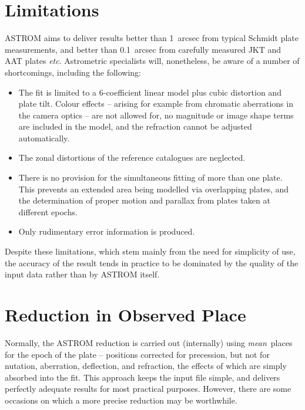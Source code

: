 \section{Limitations}
ASTROM aims to deliver results better than 1~arcsec from typical
Schmidt plate measurements, and better than 0.1~arcsec from
carefully measured
JKT and AAT plates {\it etc}.  Astrometric specialists will, nonetheless,
be aware of a number of shortcomings, including the following:
\begin{itemize}
 \item The fit is limited to a 6-coefficient linear model plus
       cubic distortion and plate tilt.  Colour effects -- arising for example
       from chromatic aberrations in the camera optics -- are not allowed
       for, no magnitude or image shape terms are included in the model,
       and the refraction cannot be adjusted automatically.
 \item The zonal distortions of the reference catalogues are neglected.
 \item There is no provision for the simultaneous fitting of
       more than one plate.  This prevents an extended area being
       modelled via overlapping plates, and the determination
       of proper motion and parallax from plates
       taken at different epochs.
 \item Only rudimentary error information is produced.
\end{itemize}
Despite these limitations, which stem mainly from the need for
simplicity of use, the accuracy of the result tends in practice
to be dominated by the quality of the input data rather
than by ASTROM itself.

\section{Reduction in Observed Place}
Normally, the ASTROM reduction is carried out
(internally) using {\it mean}\, places for the
epoch of the plate --
positions corrected for precession, but not for
nutation, aberration, deflection, and refraction, the effects of
which are simply absorbed into the fit.  This approach
keeps the input file simple, and delivers perfectly
adequate results for most practical purposes.
However, there are some occasions on which a more precise reduction
may be worthwhile.

